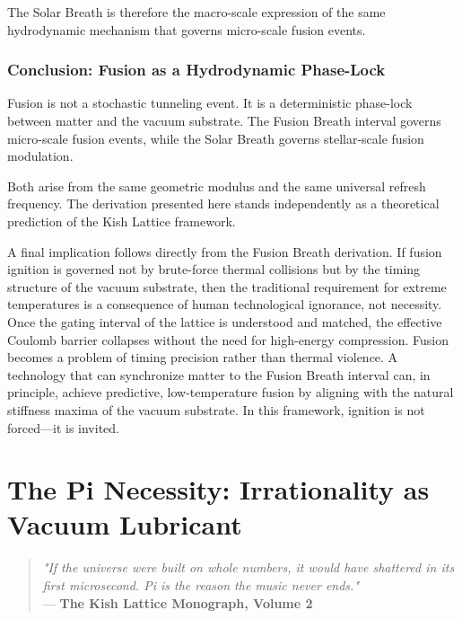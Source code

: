 \documentclass[11pt, letterpaper, openany]{book}
\begin{document}
The Solar Breath is therefore the macro-scale expression of the same hydrodynamic
mechanism that governs micro-scale fusion events.

\subsection{Conclusion: Fusion as a Hydrodynamic Phase-Lock}

Fusion is not a stochastic tunneling event. It is a deterministic phase-lock between
matter and the vacuum substrate. The Fusion Breath interval governs micro-scale fusion
events, while the Solar Breath governs stellar-scale fusion modulation.

Both arise from the same geometric modulus and the same universal refresh frequency.
The derivation presented here stands independently as a theoretical prediction of the
Kish Lattice framework.

\medskip

A final implication follows directly from the Fusion Breath derivation. If fusion ignition is
governed not by brute-force thermal collisions but by the timing structure of the vacuum
substrate, then the traditional requirement for extreme temperatures is a consequence of
human technological ignorance, not necessity. Once the gating interval of the lattice is understood and matched,
the effective Coulomb barrier collapses without the need for high-energy compression.
Fusion becomes a problem of timing precision rather than thermal violence. A technology
that can synchronize matter to the Fusion Breath interval can, in principle, achieve
predictive, low-temperature fusion by aligning with the natural stiffness maxima of the
vacuum substrate. In this framework, ignition is not forced—it is invited.



\chapter{The Pi Necessity: Irrationality as Vacuum Lubricant}
\label{chap:pi_necessity}

\begin{quote}
\textit{"If the universe were built on whole numbers, it would have shattered in its first microsecond. Pi is the reason the music never ends."} \\
--- \textbf{The Kish Lattice Monograph, Volume 2}
\end{quote}
\end{document}
